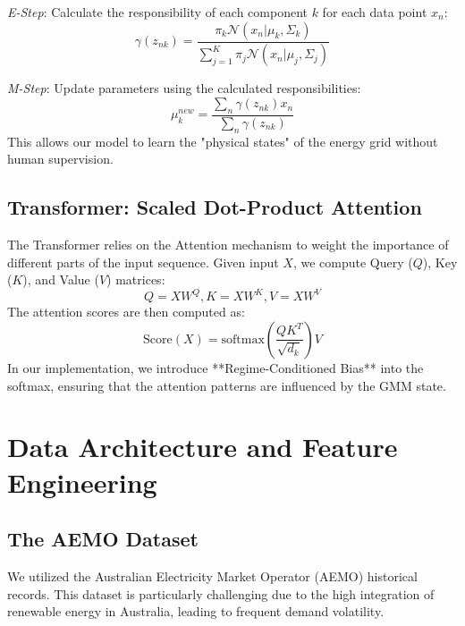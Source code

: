 \documentclass[conference]{IEEEtran}
\begin{document}
\textit{E-Step}: Calculate the responsibility of each component $k$ for each data point $x_n$:
\begin{equation}
\gamma(z_{nk}) = \frac{\pi_k \mathcal{N}(x_n | \mu_k, \Sigma_k)}{\sum_{j=1}^K \pi_j \mathcal{N}(x_n | \mu_j, \Sigma_j)}
\end{equation}

\textit{M-Step}: Update parameters using the calculated responsibilities:
\begin{equation}
\mu_k^{new} = \frac{\sum_n \gamma(z_{nk}) x_n}{\sum_n \gamma(z_{nk})}
\end{equation}
This allows our model to learn the "physical states" of the energy grid without human supervision.

\subsection{Transformer: Scaled Dot-Product Attention}
The Transformer relies on the Attention mechanism to weight the importance of different parts of the input sequence. Given input $X$, we compute Query ($Q$), Key ($K$), and Value ($V$) matrices:
\begin{equation}
Q = X W^Q, K = X W^K, V = X W^V
\end{equation}
The attention scores are then computed as:
\begin{equation}
\text{Score}(X) = \text{softmax}\left(\frac{QK^T}{\sqrt{d_k}}\right)V
\end{equation}
In our implementation, we introduce **Regime-Conditioned Bias** into the softmax, ensuring that the attention patterns are influenced by the GMM state.

\section{Data Architecture and Feature Engineering}
\subsection{The AEMO Dataset}
We utilized the Australian Electricity Market Operator (AEMO) historical records. This dataset is particularly challenging due to the high integration of renewable energy in Australia, leading to frequent demand volatility.
\end{document}
